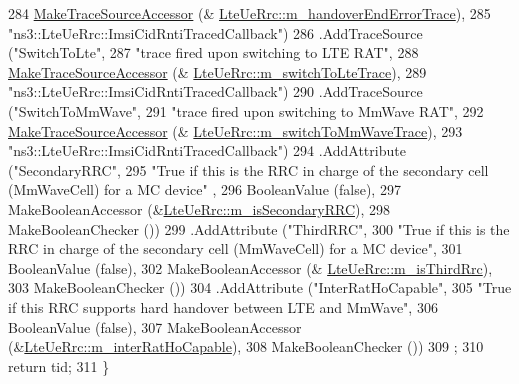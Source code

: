 \begin{DoxyCode}
284                      \hyperlink{group__tracing_gab21a770b9855af4e8f69f7531ea4a6b0}{MakeTraceSourceAccessor} (&
      \hyperlink{classns3_1_1LteUeRrc_a226e5db3b276ff4cb1c1ca4b6a166190}{LteUeRrc::m\_handoverEndErrorTrace}),
285                      \textcolor{stringliteral}{"ns3::LteUeRrc::ImsiCidRntiTracedCallback"})
286     .AddTraceSource (\textcolor{stringliteral}{"SwitchToLte"},
287                      \textcolor{stringliteral}{"trace fired upon switching to LTE RAT"},
288                      \hyperlink{group__tracing_gab21a770b9855af4e8f69f7531ea4a6b0}{MakeTraceSourceAccessor} (&
      \hyperlink{classns3_1_1LteUeRrc_ac2e5a6cefe599874f1f54c19fbd20a35}{LteUeRrc::m\_switchToLteTrace}),
289                      \textcolor{stringliteral}{"ns3::LteUeRrc::ImsiCidRntiTracedCallback"})
290     .AddTraceSource (\textcolor{stringliteral}{"SwitchToMmWave"},
291                      \textcolor{stringliteral}{"trace fired upon switching to MmWave RAT"},
292                      \hyperlink{group__tracing_gab21a770b9855af4e8f69f7531ea4a6b0}{MakeTraceSourceAccessor} (&
      \hyperlink{classns3_1_1LteUeRrc_a7639b7deb1468b3ba98c4c8731832597}{LteUeRrc::m\_switchToMmWaveTrace}),
293                      \textcolor{stringliteral}{"ns3::LteUeRrc::ImsiCidRntiTracedCallback"})
294     .AddAttribute (\textcolor{stringliteral}{"SecondaryRRC"},
295                      \textcolor{stringliteral}{"True if this is the RRC in charge of the secondary cell (MmWaveCell) for a MC device"}
      ,
296                      BooleanValue (\textcolor{keyword}{false}),
297                      MakeBooleanAccessor (&\hyperlink{classns3_1_1LteUeRrc_a00a3ffa4dd31c1ab66921a9a019f5586}{LteUeRrc::m\_isSecondaryRRC}),
298                      MakeBooleanChecker ())
299         .AddAttribute (\textcolor{stringliteral}{"ThirdRRC"},
300                                                 \textcolor{stringliteral}{"True if this is the RRC in charge of the secondary cell
       (MmWaveCell) for a MC device"},
301                                                         BooleanValue (\textcolor{keyword}{false}),
302                                                               MakeBooleanAccessor (&
      \hyperlink{classns3_1_1LteUeRrc_a5412b24e867c43a3ca7ed055e1b20c09}{LteUeRrc::m\_isThirdRrc}),
303                                                               MakeBooleanChecker ())
304     .AddAttribute (\textcolor{stringliteral}{"InterRatHoCapable"},
305                      \textcolor{stringliteral}{"True if this RRC supports hard handover between LTE and MmWave"},
306                      BooleanValue (\textcolor{keyword}{false}),
307                      MakeBooleanAccessor (&\hyperlink{classns3_1_1LteUeRrc_a0702e1a453de2d8f1c454fea344ef4f0}{LteUeRrc::m\_interRatHoCapable}),
308                      MakeBooleanChecker ())
309   ;
310   \textcolor{keywordflow}{return} tid;
311 \}
\end{DoxyCode}



